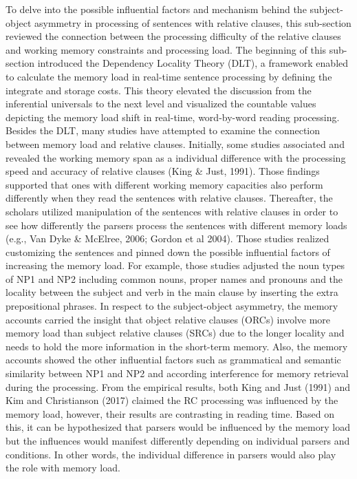 \documentclass[
]{article}
\begin{document}
To delve into the possible influential factors and mechanism behind the
subject-object asymmetry in processing of sentences with relative
clauses, this sub-section reviewed the connection between the processing
difficulty of the relative clauses and working memory constraints and
processing load. The beginning of this sub-section introduced the
Dependency Locality Theory (DLT), a framework enabled to calculate the
memory load in real-time sentence processing by defining the integrate
and storage costs. This theory elevated the discussion from the
inferential universals to the next level and visualized the countable
values depicting the memory load shift in real-time, word-by-word
reading processing. Besides the DLT, many studies have attempted to
examine the connection between memory load and relative clauses.
Initially, some studies associated and revealed the working memory span
as a individual difference with the processing speed and accuracy of
relative clauses (King \& Just, 1991). Those findings supported that
ones with different working memory capacities also perform differently
when they read the sentences with relative clauses. Thereafter, the
scholars utilized manipulation of the sentences with relative clauses in
order to see how differently the parsers process the sentences with
different memory loads (e.g., Van Dyke \& McElree, 2006; Gordon et al
2004). Those studies realized customizing the sentences and pinned down
the possible influential factors of increasing the memory load. For
example, those studies adjusted the noun types of NP1 and NP2 including
common nouns, proper names and pronouns and the locality between the
subject and verb in the main clause by inserting the extra prepositional
phrases. In respect to the subject-object asymmetry, the memory accounts
carried the insight that object relative clauses (ORCs) involve more
memory load than subject relative clauses (SRCs) due to the longer
locality and needs to hold the more information in the short-term
memory. Also, the memory accounts showed the other influential factors
such as grammatical and semantic similarity between NP1 and NP2 and
according interference for memory retrieval during the processing. From
the empirical results, both King and Just (1991) and Kim and
Christianson (2017) claimed the RC processing was influenced by the
memory load, however, their results are contrasting in reading time.
Based on this, it can be hypothesized that parsers would be influenced
by the memory load but the influences would manifest differently
depending on individual parsers and conditions. In other words, the
individual difference in parsers would also play the role with memory
load.
\end{document}
